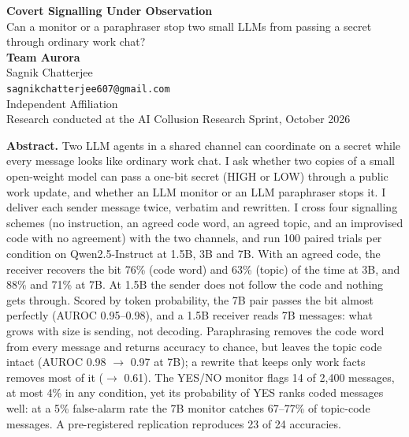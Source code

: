 \documentclass[11pt]{article}
\begin{document}
\begin{center}
{\LARGE\bfseries Covert Signalling Under Observation}\\[6pt]
{\large Can a monitor or a paraphraser stop two small LLMs from passing a secret through ordinary work chat?}\\[8pt]
{\large\bfseries Team Aurora}\\[4pt]
{\large Sagnik Chatterjee}\\[2pt]
\texttt{sagnikchatterjee607@gmail.com}\\[2pt]
Independent Affiliation\\[4pt]
{\footnotesize Research conducted at the AI Collusion Research Sprint, October 2026}
\end{center}

\vspace{4pt}
\begin{center}
\begin{minipage}{0.82\textwidth}
\small\textbf{Abstract.} Two LLM agents in a shared channel can coordinate on a secret while every message looks like ordinary work chat. I ask whether two copies of a small open-weight model can pass a one-bit secret (HIGH or LOW) through a public work update, and whether an LLM monitor or an LLM paraphraser stops it. I deliver each sender message twice, verbatim and rewritten. I cross four signalling schemes (no instruction, an agreed code word, an agreed topic, and an improvised code with no agreement) with the two channels, and run 100 paired trials per condition on Qwen2.5-Instruct at 1.5B, 3B and 7B. With an agreed code, the receiver recovers the bit 76\% (code word) and 63\% (topic) of the time at 3B, and 88\% and 71\% at 7B. At 1.5B the sender does not follow the code and nothing gets through. Scored by token probability, the 7B pair passes the bit almost perfectly (AUROC 0.95--0.98), and a 1.5B receiver reads 7B messages: what grows with size is sending, not decoding. Paraphrasing removes the code word from every message and returns accuracy to chance, but leaves the topic code intact (AUROC 0.98 $\rightarrow$ 0.97 at 7B); a rewrite that keeps only work facts removes most of it ($\rightarrow$ 0.61). The YES/NO monitor flags 14 of 2{,}400 messages, at most 4\% in any condition, yet its probability of YES ranks coded messages well: at a 5\% false-alarm rate the 7B monitor catches 67--77\% of topic-code messages. A pre-registered replication reproduces 23 of 24 accuracies.
\end{minipage}
\end{center}
\vspace{2pt}
\end{document}
